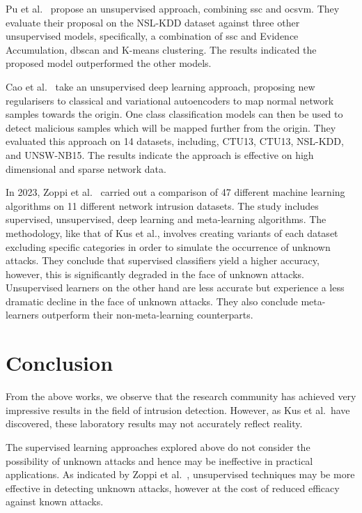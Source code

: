 Pu et al.~\cite{Pu} propose an unsupervised approach, combining \gls{ssc} and
\gls{ocsvm}. They evaluate their proposal on the NSL-KDD dataset against three
other unsupervised models, specifically, a combination of \gls{ssc} and
Evidence Accumulation, \gls{dbscan} and K-means clustering. The results
indicated the proposed model outperformed the other models.

Cao et al.~\cite{Cao} take an unsupervised deep learning approach, proposing
new regularisers to classical and variational autoencoders to map normal
network samples towards the origin. One class classification models can then be
used to detect malicious samples which will be mapped further from the origin.
They evaluated this approach on 14 datasets, including, CTU13, CTU13,
NSL-KDD, and UNSW-NB15. The results indicate the approach is effective on high
dimensional and sparse network data.

In 2023, Zoppi et al.~\cite{Zoppi} carried out a comparison of 47 different
machine learning algorithms on 11 different network intrusion datasets. The
study includes supervised, unsupervised, deep learning and meta-learning
algorithms. The methodology, like that of Kus et al., involves creating
variants of each dataset excluding specific categories in order to simulate the
occurrence of unknown attacks. They conclude that supervised classifiers yield
a higher accuracy, however, this is significantly degraded in the face of
unknown attacks. Unsupervised learners on the other hand are less accurate but
experience a less dramatic decline in the face of unknown attacks. They also
conclude meta-learners outperform their non-meta-learning counterparts.

\section{Conclusion}%
\label{sec:conclusion}
From the above works, we observe that the research community has achieved
very impressive results in the field of intrusion detection. However, as Kus et
al.\ have discovered, these laboratory results may not accurately reflect
reality.

The supervised learning approaches explored above do not consider the
possibility of unknown attacks and hence may be ineffective in practical
applications. As indicated by Zoppi et al.~\cite{Zoppi}, unsupervised
techniques may be more effective in detecting unknown attacks, however at the
cost of reduced efficacy against known attacks.
